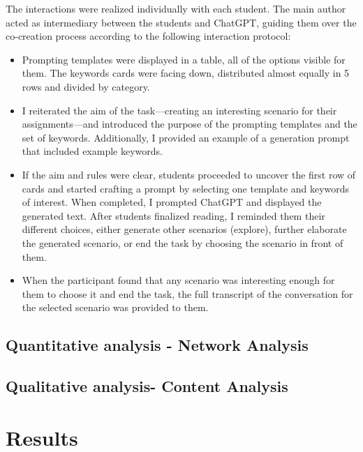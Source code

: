 \documentclass[sn-mathphys, Numbered]{sn-jnl}%
\theoremstyle{thmstyleone}%
\theoremstyle{thmstyletwo}%
\theoremstyle{thmstylethree}%
\begin{document}
The interactions were realized individually with each student. The main author acted as intermediary between the students and ChatGPT, guiding them over the co-creation process according to the following interaction protocol:
    \begin{itemize}

        \item  Prompting templates were displayed in a table, all of the options visible for them. The keywords cards were facing down, distributed almost equally in 5 rows and divided by category.
        \item I reiterated the aim of the task---creating an interesting scenario for their assignments---and introduced the purpose of the prompting templates and the set of keywords. Additionally, I provided an example of a generation prompt that included example keywords.
        \item If the aim and rules were clear, students proceeded to uncover the first row of cards and started crafting a prompt by selecting one template and keywords of interest. When completed, I prompted ChatGPT and displayed the generated text. After students finalized reading, I reminded them their different choices, either generate other scenarios (explore), further elaborate the generated scenario, or end the task by choosing the scenario in front of them.
        \item When the participant found that any scenario was interesting enough for them to choose it and end the task, the full transcript of the conversation for the selected scenario was provided to them.
    \end{itemize}




\subsection{Quantitative analysis - Network Analysis}\label{Quantitative Analysis}

\subsection{Qualitative analysis- Content Analysis}\label{Qualitative Analysis}



\section{Results}\label{Results}
\end{document}
